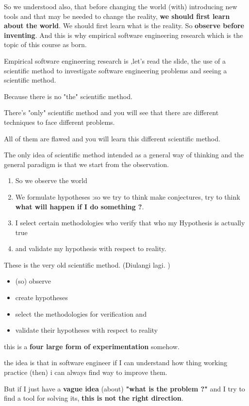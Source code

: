\documentclass[conference, compsoc, twoside]{IEEEtran}
\begin{document}
So we understood also, that before changing the world (with) introducing new tools and that may be needed to change the reality, \textbf{we should first learn about the world}.
We should first learn what is the reality. 
So \textbf{observe before inventing}.
And this is why empirical software engineering research which is the topic of this course as born.

Empirical software engineering research is ,let's read the slide, the use of a scientific method to investigate software engineering problems and seeing a scientific method.

Because there is no "the" scientific method. 

There's "only" scientific method and you will see that there are different techniques to face different problems.

All of them are flawed and you will learn this different scientific method.

The only idea of scientific method intended as a general way of thinking and the general paradigm is that we start from the observation. 
 \begin{enumerate}
 	\item So we observe the world
 	\item We formulate hypotheses :so we try to think make conjectures, try to think \textbf{what will happen if I do something ?}.
 	\item I select certain methodologies who verify that who my Hypothesis is actually true 
 	\item and validate my hypothesis with respect to reality. 
 \end{enumerate}
 These is the very old scientific method. 
 (Diulangi lagi. )
 \begin{itemize}
 	\item (so) observe 
 	\item create hypotheses
 	\item select the methodologies for verification and
 	\item validate their hypotheses with respect to reality  	
 \end{itemize}
this is a \textbf{four large form of experimentation} somehow.

the idea is that in software engineer if I can understand how thing working practice (then) i can always find way to improve them.

But if I just have a \textbf{vague idea} (about) \textbf{"what is the problem ?"} and I try to find a tool for solving its, \textbf{this is not the right direction}. 
\end{document}
